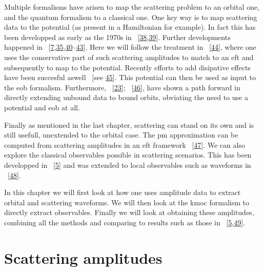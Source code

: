\documentclass[
  10pt,
  a4paper,
  DIV=11,
  numbers=noendperiod,
  twoside]{scrreprt}
\DeclareRobustCommand{\[}{\begin{equation}}
\DeclareRobustCommand{\]}{\end{equation}}
\begin{document}
Multiple formalisms have arisen to map the scattering problem to an
orbital one, and the quantum formalism to a classical one. One key way
is to map scattering data to the potential (as present in a Hamiltonian
for example). In fact this has been developped as early as the 1970s in
~{[}\protect\hyperlink{ref-Hiida:1972xs}{38},\protect\hyperlink{ref-Iwasaki:1971vb}{39}{]}.
Further developments happened in
~{[}\protect\hyperlink{ref-Neill:2013wsa}{7},\protect\hyperlink{ref-Damour:2016gwp}{35},\protect\hyperlink{ref-Bjerrum-Bohr:2013bxa}{40}--\protect\hyperlink{ref-Guevara:2017csg}{43}{]}.
Here we will follow the treatment in
~{[}\protect\hyperlink{ref-Cheung:2018wkq}{44}{]}, where one uses the
conservative part of such scattering amplitudes to match to an \gls{eft}
and subsequently to map to the potential. Recently efforts to add
disipative effects have been succesful aswell ~{[}see
\protect\hyperlink{ref-Kalin:2022hph}{45}{]}. This potential can then be
used as input to the \gls{eob} formalism. Furthermore,
~{[}\protect\hyperlink{ref-Kalin:2019rwq}{23}{]};
~{[}\protect\hyperlink{ref-Kalin:2019inp}{46}{]}, have shown a path
forward in directly extending unbound data to bound orbits, obviating
the need to use a potential and \gls{eob} at all.

Finally as mentioned in the last chapter, scattering can stand on its
own and is still usefull, unextended to the orbital case. The \gls{pm}
approximation can be computed from scattering amplitudes in an \gls{eft}
framework ~{[}\protect\hyperlink{ref-Kalin:2020mvi}{47}{]}. We can also
explore the classical observables possible in scattering scenarios. This
has been developped in ~{[}\protect\hyperlink{ref-Kosower:2018adc}{5}{]}
and was extended to local observables such as
waveforms in ~{[}\protect\hyperlink{ref-Cristofoli:2021vyo}{48}{]}.

In this chapter we will first look at how one uses amplitude data to
extract orbital and scattering waveforms. We will then look at the
\gls{kmoc} formalism to directly extract observables. Finally we will
look at obtaining these amplitudes, combining all the methods and
comparing to results such as those in
~{[}\protect\hyperlink{ref-Kosower:2018adc}{5},\protect\hyperlink{ref-Bern:2021xze}{49}{]}.

\hypertarget{sec-scatamp}{%
\section{Scattering amplitudes}\label{sec-scatamp}}
\end{document}
